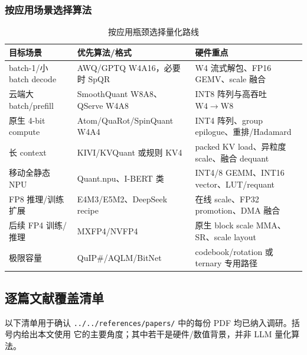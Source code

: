 \subsubsection{按应用场景选择算法}

\begin{table}[H]
  \centering
  \small
  \caption{按应用瓶颈选择量化路线}
  \label{tab:algorithm-selection}
  \begin{tabular}{p{3.2cm}p{5.1cm}p{5.0cm}}
    \toprule
    目标场景 & 优先算法/格式 & 硬件重点 \\
    \midrule
    batch-1/小 batch decode & AWQ/GPTQ W4A16，必要时 SpQR & W4 流式解包、FP16 GEMV、scale 融合 \\
    云端大 batch/prefill & SmoothQuant W8A8、QServe W4A8 & INT8 阵列与高吞吐 $\mathrm{W4}\rightarrow\mathrm{W8}$ \\
    原生 4-bit compute & Atom/QuaRot/SpinQuant W4A4 & INT4 阵列、group epilogue、重排/Hadamard \\
    长 context & KIVI/KVQuant 或规则 KV4 & packed KV load、异粒度 scale、融合 dequant \\
    移动全静态 NPU & Quant.npu、I-BERT 类 & INT4/8 GEMM、INT16 vector、LUT/requant \\
    FP8 推理/训练扩展 & E4M3/E5M2、DeepSeek recipe & 在线 scale、FP32 promotion、DMA 融合 \\
    后续 FP4 训练/推理 & MXFP4/NVFP4 & 原生 block scale MMA、SR、scale layout \\
    极限容量 & QuIP\#/AQLM/BitNet & codebook/rotation 或 ternary 专用路径 \\
    \bottomrule
  \end{tabular}
\end{table}

\subsection{逐篇文献覆盖清单}

以下清单用于确认 \texttt{../../references/papers/} 中的每份 PDF 均已纳入调研。括号内给出本文使用
它的主要角度；其中若干是硬件/数值背景，并非 LLM 量化算法。


